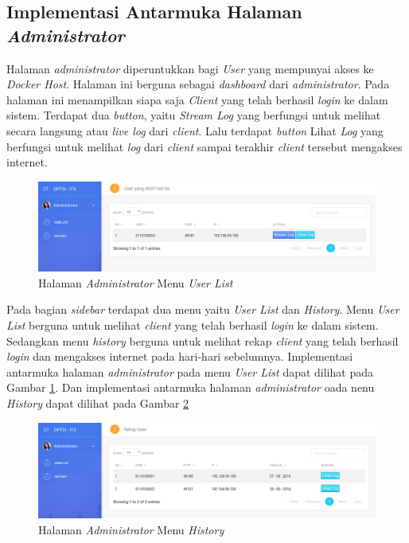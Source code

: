\subsection{Implementasi Antarmuka Halaman \textit{Administrator}}
Halaman \textit{administrator} diperuntukkan bagi \textit{User} yang mempunyai akses ke \textit{Docker Host}. Halaman ini berguna sebagai \textit{dashboard} dari \textit{administrator}. Pada halaman ini menampilkan siapa saja \textit{Client} yang telah berhasil \textit{login} ke dalam sistem. Terdapat dua \textit{button}, yaitu \textit{Stream Log} yang berfungsi untuk melihat secara langsung atau \textit{live log} dari \textit{client}. Lalu terdapat \textit{button} Lihat \textit{Log} yang berfungsi untuk melihat \textit{log} dari \textit{client} sampai terakhir \textit{client} tersebut mengakses internet.

\begin{figure}[H]
	\centering
	\includegraphics[width=\linewidth]{images/bab4/useraktif}
	\caption{Halaman \textit{Administrator} Menu \textit{User List}}
	\label{halamandashboardadmin}
\end{figure}

Pada bagian \textit{sidebar} terdapat dua menu yaitu \textit{User List} dan \textit{History}. Menu \textit{User List} berguna untuk melihat \textit{client} yang telah berhasil \textit{login} ke dalam sistem. Sedangkan menu \textit{history} berguna untuk melihat rekap \textit{client} yang telah berhasil \textit{login} dan mengakses internet pada hari-hari sebelumnya. Implementasi antarmuka halaman \textit{administrator} pada menu \textit{User List} dapat dilihat pada Gambar \ref{halamandashboardadmin}. Dan implementasi antarmuka halaman \textit{administrator} oada nenu \textit{History} dapat dilihat pada Gambar \ref{userrekap}

\begin{figure}[H]
	\centering
	\includegraphics[width=\linewidth]{images/bab4/userrekap}
	\caption{Halaman \textit{Administrator} Menu \textit{History}}
	\label{userrekap}
\end{figure}